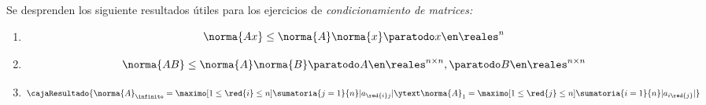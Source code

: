 \begin{enumerate}[label=\tiny\purple{\faIcon{snowman}}]
        Se desprenden los siguiente resultados útiles para los ejercicios de \textit{condicionamiento de matrices:}
        \begin{enumerate}[label=\purple{\faIcon{gamepad}$_{\arabic*)}$}]
          \item
                $$
                  \norma{Ax} \leq \norma{A} \norma{x} \paratodo x\en \reales^n
                $$
          \item
                $$
                  \norma{AB} \leq \norma{A} \norma{B} \paratodo A \en \reales^{n \times n}, \paratodo B \en \reales^{n \times n}
                $$
          \item
                $$
                  \cajaResultado{
                  \norma{A}_\infinito = \maximo[1\leq \red{i} \leq n]\sumatoria{j=1}{n}|a_{\red{i}j}|
                  \ytext
                  \norma{A}_1 = \maximo[1\leq \red{j} \leq n]\sumatoria{i=1}{n}|a_{i\red{j}}|
                  }
                $$
        \end{enumerate}
\end{enumerate}

